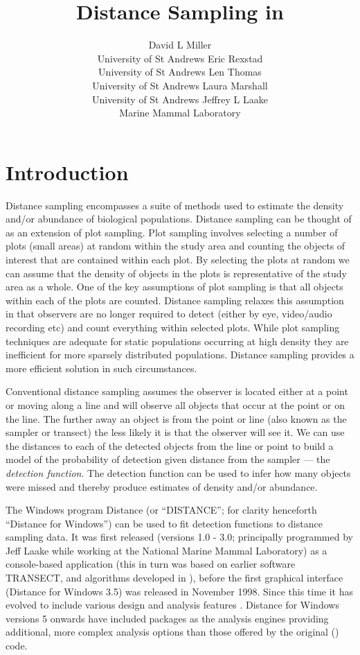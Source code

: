 \documentclass[article]{jss}\usepackage[]{graphicx}\usepackage[]{color}
\author{David L Miller\\University of St Andrews \AND 
        Eric Rexstad\\University of St Andrews \And 
        Len Thomas\\University of St Andrews \AND 
        Laura Marshall\\University of St Andrews \And 
        Jeffrey L Laake\\Marine Mammal Laboratory}
\title{Distance Sampling in \proglang{R}}
\begin{document}
\section{Introduction}


Distance sampling \citep{Buckland:2001vm, Buckland:2004ts, buckland2015distance} encompasses a suite of methods used to estimate the density and/or abundance of biological populations. Distance sampling can be thought of as an extension of plot sampling. Plot sampling involves selecting a number of plots (small areas) at random within the study area and counting the objects of interest that are contained within each plot. By selecting the plots at random we can assume that the density of objects in the plots is representative of the study area as a whole. One of the key assumptions of plot sampling is that all objects within each of the plots are counted. Distance sampling relaxes this assumption in that observers are no longer required to detect (either by eye, video/audio recording etc) and count everything within selected plots. While plot sampling techniques are adequate for static populations occurring at high density they are inefficient for more sparsely distributed populations. Distance sampling provides a more efficient solution in such circumstances.

Conventional distance sampling assumes the observer is located either at a point or moving along a line and will observe all objects that occur at the point or on the line. The further away an object is from the point or line (also known as the sampler or transect) the less likely it is that the observer will see it. We can use the distances to each of the detected objects from the line or point to build a model of the probability of detection given distance from the sampler --- the \textit{detection function}. The detection function can be used to infer how many objects were missed and thereby produce estimates of density and/or abundance. 

The Windows program Distance (or ``DISTANCE''; for clarity henceforth ``Distance for Windows'') can be used to fit detection functions to distance sampling data. It was first released (versions 1.0 - 3.0; principally programmed by Jeff Laake while working at the National Marine Mammal Laboratory) as a console-based application (this in turn was based on earlier software TRANSECT, \citealp{Burnham:1980wz} and algorithms developed in \citealp{Buckland:1992fa}), before the first graphical interface (Distance for Windows 3.5) was released in November 1998. Since this time it has evolved to include various design and analysis features \citep{Thomas:2010cf}. Distance for Windows versions 5 onwards have included  \citep{rcore} packages as the analysis engines providing additional, more complex analysis options than those offered by the original () code.
\end{document}
